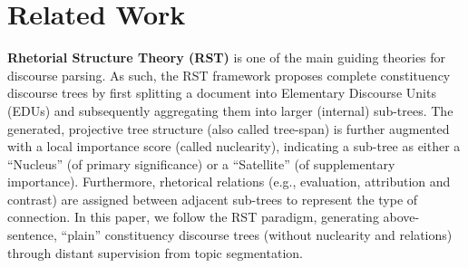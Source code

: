 \documentclass[letterpaper]{article} %
\begin{document}
\section{Related Work}
\textbf{Rhetorial Structure Theory (RST) } \cite{mann1988rhetorical} is one of the main guiding theories for discourse parsing. As such, the RST framework proposes complete constituency discourse trees by first splitting a document into Elementary Discourse Units (EDUs) and subsequently aggregating them into larger (internal) sub-trees. The generated, projective tree structure (also called tree-span) is further augmented with a local importance score (called nuclearity), indicating a sub-tree as either a ``Nucleus'' (of primary significance) or a ``Satellite'' (of supplementary importance). 
Furthermore, rhetorical relations (e.g., evaluation, attribution and contrast) are assigned between adjacent sub-trees to represent the type of connection.  
In this paper, we follow the RST paradigm, generating above-sentence, ``plain'' constituency discourse trees (without nuclearity and relations) through distant supervision from topic segmentation.
\end{document}
